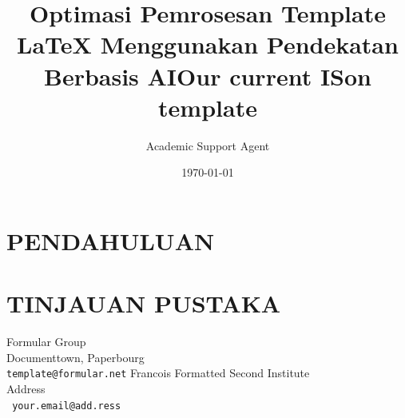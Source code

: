 \documentclass{article}
\title{Optimasi Pemrosesan Template LaTeX Menggunakan Pendekatan Berbasis AI}
\author{Academic Support Agent}
\date{\today}
\begin{document}
\maketitle

\begin{abstract}

\end{abstract}

\chapter{PENDAHULUAN}


\chapter{TINJAUAN PUSTAKA}


\usepackage{ison2019,amssymb,amsmath,epsfig}
\setcounter{page}{1}
\ninept
\graphicspath{{pics/}}

\title{Our current ISon template}

%
	{Formular Group \\ Documenttown, Paperbourg\\ {\tt template@formular.net}} {Francois Formatted}
{Second Institute \\ Address \\ {\tt
your.email@add.ress}}
\end{document}
